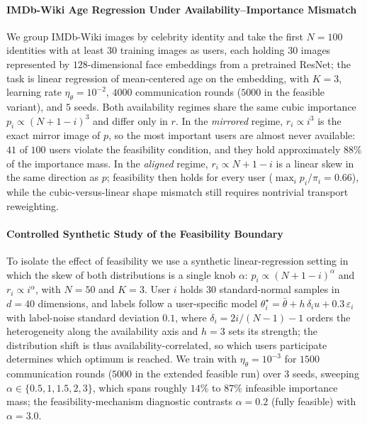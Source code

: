 \paragraph{IMDb-Wiki Age Regression Under Availability--Importance Mismatch}
We group IMDb-Wiki images by celebrity identity and take the first $N=100$
identities with at least $30$ training images as users, each holding $30$
images represented by $128$-dimensional face embeddings from a pretrained
ResNet; the task is linear regression of mean-centered age on the
embedding, with $K=3$, learning rate $\eta_\theta=10^{-2}$, $4000$
communication rounds ($5000$ in the feasible variant), and $5$ seeds. Both
availability regimes share the same cubic importance
$p_i \propto (N{+}1{-}i)^3$ and differ only in $r$. In the
\emph{mirrored} regime, $r_i \propto i^3$ is the exact mirror image of
$p$, so the most important users are almost never available: $41$ of
$100$ users violate the feasibility condition, and they hold
approximately $88\%$ of the importance mass. In the \emph{aligned} regime,
$r_i \propto N{+}1{-}i$ is a linear skew in the same direction as $p$;
feasibility then holds for every user ($\max_i p_i/\pi_i = 0.66$), while
the cubic-versus-linear shape mismatch still requires nontrivial transport
reweighting.

\paragraph{Controlled Synthetic Study of the Feasibility Boundary}
To isolate the effect of feasibility we use a synthetic linear-regression
setting in which the skew of both distributions is a single knob $\alpha$:
$p_i \propto (N{+}1{-}i)^{\alpha}$ and $r_i \propto i^{\alpha}$, with
$N=50$ and $K=3$. User $i$ holds $30$ standard-normal samples in $d=40$
dimensions, and labels follow a user-specific model
$\theta_i^{\star} = \bar\theta + h\,\delta_i u + 0.3\,\varepsilon_i$ with
label-noise standard deviation $0.1$, where $\delta_i = 2i/(N{-}1)-1$
orders the heterogeneity along the availability axis and $h=3$ sets its
strength; the distribution shift is thus availability-correlated, so which
users participate determines which optimum is reached. We train with
$\eta_\theta = 10^{-3}$ for $1500$ communication rounds ($5000$ in the
extended feasible run) over $3$ seeds, sweeping
$\alpha \in \{0.5, 1, 1.5, 2, 3\}$, which spans roughly $14\%$ to $87\%$
infeasible importance mass; the feasibility-mechanism diagnostic contrasts
$\alpha = 0.2$ (fully feasible) with $\alpha = 3.0$.


